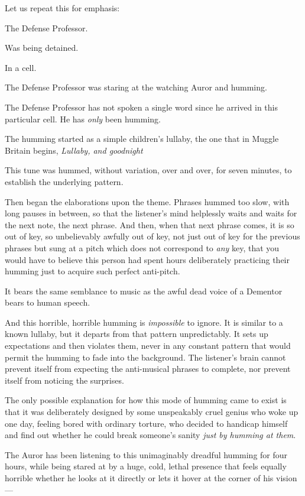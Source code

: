 Let us repeat this for emphasis:

The Defense Professor.

Was being detained.

In a cell.

The Defense Professor was staring at the watching Auror and humming.

The Defense Professor has not spoken a single word since he arrived in this
particular cell. He has \emph{only} been humming.

The humming started as a simple children's lullaby, the one that in Muggle
Britain begins, \emph{Lullaby, and goodnight{\el}}

This tune was hummed, without variation, over and over, for seven minutes, to
establish the underlying pattern.

Then began the elaborations upon the theme. Phrases hummed too slow, with long
pauses in between, so that the listener's mind helplessly waits and waits for
the next note, the next phrase. And then, when that next phrase comes, it is so
out of key, so unbelievably awfully out of key, not just out of key for the
previous phrases but sung at a pitch which does not correspond to \emph{any}
key, that you would have to believe this person had spent hours deliberately
practicing their humming just to acquire such perfect anti-pitch.

It bears the same semblance to music as the awful dead voice of a Dementor
bears to human speech.

And this horrible, horrible humming is \emph{impossible} to ignore. It is
similar to a known lullaby, but it departs from that pattern unpredictably. It
sets up expectations and then violates them, never in any constant pattern that
would permit the humming to fade into the background. The listener's brain
cannot prevent itself from expecting the anti-musical phrases to complete, nor
prevent itself from noticing the surprises.

The only possible explanation for how this mode of humming came to exist is
that it was deliberately designed by some unspeakably cruel genius who woke up
one day, feeling bored with ordinary torture, who decided to handicap himself
and find out whether he could break someone's sanity \emph{just by humming at
them}.

The Auror has been listening to this unimaginably dreadful humming for four
hours, while being stared at by a huge, cold, lethal presence that feels
equally horrible whether he looks at it directly or lets it hover at the corner
of his vision---

